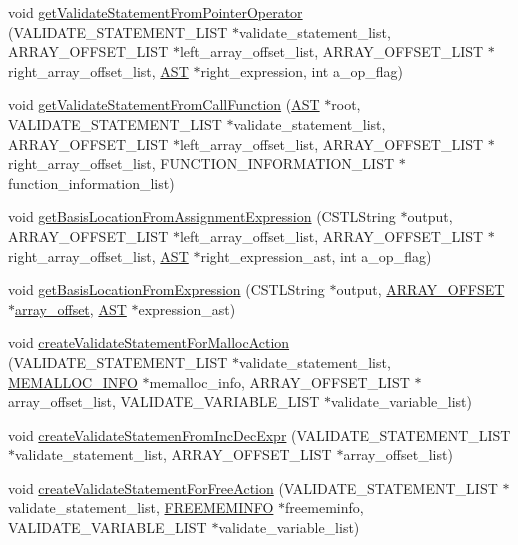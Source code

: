 \begin{DoxyCompactItemize}
\item 
void \hyperlink{Varidate__statement_8h_a92935ece8844a8e8a5ec7eed0df523bc}{getValidateStatementFromPointerOperator} (VALIDATE\_\-STATEMENT\_\-LIST $\ast$validate\_\-statement\_\-list, ARRAY\_\-OFFSET\_\-LIST $\ast$left\_\-array\_\-offset\_\-list, ARRAY\_\-OFFSET\_\-LIST $\ast$right\_\-array\_\-offset\_\-list, \hyperlink{structabstract__syntax__tree}{AST} $\ast$right\_\-expression, int a\_\-op\_\-flag)
\item 
void \hyperlink{Varidate__statement_8h_a1fcad266e45a41a6ae23650349c6adde}{getValidateStatementFromCallFunction} (\hyperlink{structabstract__syntax__tree}{AST} $\ast$root, VALIDATE\_\-STATEMENT\_\-LIST $\ast$validate\_\-statement\_\-list, ARRAY\_\-OFFSET\_\-LIST $\ast$left\_\-array\_\-offset\_\-list, ARRAY\_\-OFFSET\_\-LIST $\ast$right\_\-array\_\-offset\_\-list, FUNCTION\_\-INFORMATION\_\-LIST $\ast$function\_\-information\_\-list)
\item 
void \hyperlink{Varidate__statement_8h_a613d3eee495ee9097bf53699f1495205}{getBasisLocationFromAssignmentExpression} (CSTLString $\ast$output, ARRAY\_\-OFFSET\_\-LIST $\ast$left\_\-array\_\-offset\_\-list, ARRAY\_\-OFFSET\_\-LIST $\ast$right\_\-array\_\-offset\_\-list, \hyperlink{structabstract__syntax__tree}{AST} $\ast$right\_\-expression\_\-ast, int a\_\-op\_\-flag)
\item 
void \hyperlink{Varidate__statement_8h_a8bece040dd7a61d7936e87da300d2dad}{getBasisLocationFromExpression} (CSTLString $\ast$output, \hyperlink{structarray__offset}{ARRAY\_\-OFFSET} $\ast$\hyperlink{structarray__offset}{array\_\-offset}, \hyperlink{structabstract__syntax__tree}{AST} $\ast$expression\_\-ast)
\item 
void \hyperlink{Varidate__statement_8h_aaa4b66ed2d29ec4dd42a288b37e2a7de}{createValidateStatementForMallocAction} (VALIDATE\_\-STATEMENT\_\-LIST $\ast$validate\_\-statement\_\-list, \hyperlink{structmemory__allocation__info}{MEMALLOC\_\-INFO} $\ast$memalloc\_\-info, ARRAY\_\-OFFSET\_\-LIST $\ast$array\_\-offset\_\-list, VALIDATE\_\-VARIABLE\_\-LIST $\ast$validate\_\-variable\_\-list)
\item 
void \hyperlink{Varidate__statement_8h_ac836a7545fa31d002b5f8522fb5c7272}{createValidateStatemenFromIncDecExpr} (VALIDATE\_\-STATEMENT\_\-LIST $\ast$validate\_\-statement\_\-list, ARRAY\_\-OFFSET\_\-LIST $\ast$array\_\-offset\_\-list)
\item 
void \hyperlink{Varidate__statement_8h_a7a4c169635ae15aa731d31e26e54efd5}{createValidateStatementForFreeAction} (VALIDATE\_\-STATEMENT\_\-LIST $\ast$validate\_\-statement\_\-list, \hyperlink{structfreemem__info}{FREEMEMINFO} $\ast$freememinfo, VALIDATE\_\-VARIABLE\_\-LIST $\ast$validate\_\-variable\_\-list)

\end{DoxyCompactItemize}
